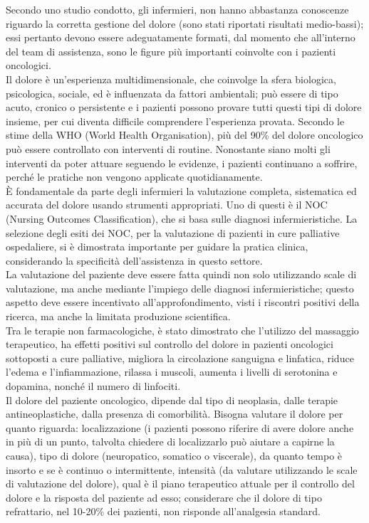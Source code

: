 Secondo uno studio condotto, gli infermieri, non hanno abbastanza conoscenze riguardo la corretta gestione del dolore
(sono stati riportati risultati medio-bassi)\cite{PAIN}; essi pertanto devono essere adeguatamente formati, 
dal momento che all’interno del team di assistenza, sono le figure più importanti coinvolte con i pazienti 
oncologici.\\
Il dolore è un’esperienza multidimensionale, che coinvolge la sfera biologica, psicologica, sociale, ed è 
influenzata da fattori ambientali; può essere di tipo acuto, cronico o persistente e i pazienti possono 
provare tutti questi tipi di dolore insieme, per cui diventa difficile comprendere l’esperienza provata. 
Secondo le stime  della WHO (World Health Organisation), più del 90\% del dolore oncologico può essere 
controllato con interventi di routine. Nonostante siano molti gli interventi da poter attuare seguendo le evidenze, 
i pazienti continuano a soffrire, perché le pratiche non vengono applicate quotidianamente\cite{PAINONS}.\\
È fondamentale da parte degli infermieri la valutazione completa, sistematica ed accurata del dolore usando 
strumenti appropriati. Uno di questi è il NOC (Nursing Outcomes Classification), che si basa sulle diagnosi infermieristiche. 
La selezione degli esiti dei NOC, per la valutazione di pazienti in cure palliative ospedaliere, si è dimostrata 
importante per guidare la pratica clinica, considerando la specificità dell’assistenza in questo settore\cite{painNOC}.\\
La valutazione del paziente deve essere fatta quindi non solo utilizzando scale di valutazione, ma anche 
mediante l’impiego delle diagnosi infermieristiche; questo aspetto deve essere 
incentivato all’approfondimento, visti i riscontri positivi della ricerca, ma anche la limitata 
produzione scientifica.\\
Tra le terapie non farmacologiche, è stato dimostrato che l’utilizzo del massaggio terapeutico, ha effetti positivi sul 
controllo del dolore in pazienti oncologici sottoposti a cure palliative, migliora la circolazione sanguigna e linfatica, 
riduce l’edema e l’infiammazione, rilassa i muscoli, aumenta i livelli di 
serotonina e dopamina, nonché il numero di linfociti\cite{tpnonfarmacologiche}.\\

Il dolore del paziente oncologico, dipende dal tipo di neoplasia, dalle terapie antineoplastiche, 
dalla presenza di comorbilità. Bisogna valutare il dolore per quanto riguarda: 
localizzazione (i pazienti possono riferire di avere dolore anche in più di un punto, talvolta chiedere di 
localizzarlo può aiutare a capirne la causa), tipo di dolore (neuropatico, somatico o viscerale), 
da quanto tempo è insorto e se è continuo o intermittente, intensità (da valutare utilizzando le scale 
di valutazione del dolore), qual è il piano terapeutico attuale per il controllo del dolore e la risposta 
del paziente ad esso; considerare che il dolore di tipo refrattario, nel 10-20\% dei pazienti, 
non risponde all’analgesia standard\cite{CANCERPAINONS}.\\

